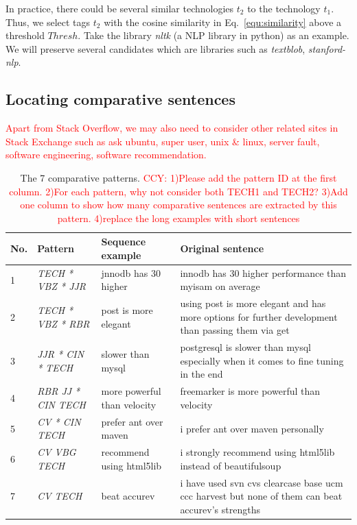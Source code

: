 In practice, there could be several similar technologies $t_2$ to the technology $t_1$.
Thus, we select tags $t_2$ with the cosine similarity in Eq.~\ref{equ:similarity} above a threshold $Thresh$.
Take the library \textit{nltk} (a NLP library in python) as an example.
We will preserve several candidates which are libraries such as \textit{textblob}, \textit{stanford-nlp}.

\subsection{Locating comparative sentences}
\textcolor{red}{Apart from Stack Overflow, we may also need to consider other related sites in Stack Exchange such as ask ubuntu, super user, unix \& linux, server fault, software engineering, software recommendation.}

\begin{table}
	\centering
	\label{tab:pattern}
	\begin{tabular}{l l l l}
	\hline
	No. & Pattern & Sequence example & Original sentence \\ \hline \hline
	1 & \textit{TECH * VBZ * JJR} & jnnodb has 30 higher & innodb has 30 higher performance than myisam on average\\
	2 & \textit{TECH * VBZ * RBR} & post is more elegant & using post is more elegant and has more options for further development than passing them via get
\\
	3 & \textit{JJR * CIN * TECH} & slower than mysql & postgresql is slower than mysql especially when it comes to fine tuning in the end \\
	4 & \textit{RBR JJ * CIN TECH} & more powerful than velocity & freemarker is more powerful than velocity
 \\
	5 & \textit{CV * CIN TECH} & prefer ant over maven & i prefer ant over maven personally
\\
	6 & \textit{CV VBG TECH} & recommend using html5lib & i strongly recommend using html5lib instead of beautifulsoup
\\
	7 & \textit{CV TECH} & beat accurev & i have used svn cvs clearcase base ucm ccc harvest but none of them can beat accurev's strengths\\ \hline
	\end{tabular}
	\caption{The 7 comparative patterns. \textcolor{red}{CCY: 1)Please add the pattern ID at the first column. 2)For each pattern, why not consider both TECH1 and TECH2? 3)Add one column to show how many comparative sentences are extracted by this pattern. 4)replace the long examples with short sentences} }
\end{table}

